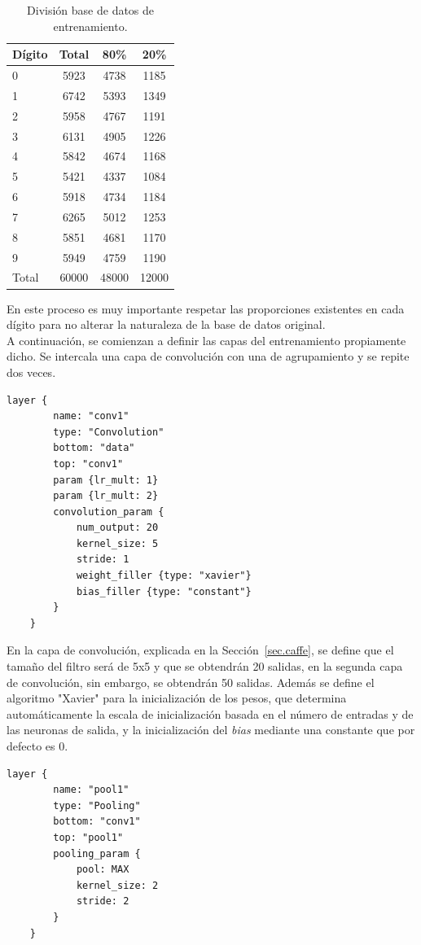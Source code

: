 	\begin{table}[H]
		\centering
		\begin{tabular}{|l|c|c|c|}
			\hline
			\textbf{Dígito} & \textbf{Total} & \textbf{80\%} & \textbf{20\%} \\
			\hline \hline
			0 & 5923 & 4738 & 1185\\ \hline
			1 & 6742 & 5393 & 1349\\ \hline
			2 & 5958 & 4767 & 1191\\ \hline
			3 & 6131 & 4905 & 1226\\ \hline
			4 & 5842 & 4674 & 1168\\ \hline
			5 & 5421 & 4337 & 1084\\ \hline
			6 & 5918 & 4734 & 1184\\ \hline
			7 & 6265 & 5012 & 1253\\ \hline
			8 & 5851 & 4681 & 1170\\ \hline
			9 & 5949 & 4759 & 1190\\ \hline
			Total & 60000 & 48000 & 12000\\ \hline
		\end{tabular}
		\caption{División base de datos de entrenamiento.}
		\label{tab.baseDatos}
	\end{table}
	\vspace{20pt}
	En este proceso es muy importante respetar las proporciones existentes en cada dígito para no alterar la naturaleza de la base de datos original.\\
	
	A continuación, se comienzan a definir las capas del entrenamiento propiamente dicho. Se intercala una capa de convolución con una de agrupamiento y se repite dos veces.
	\vspace{10pt}
	\begin{lstlisting}[frame=single]
	layer {
		name: "conv1"
		type: "Convolution"
		bottom: "data"
		top: "conv1"
		param {lr_mult: 1}
		param {lr_mult: 2}
		convolution_param {
			num_output: 20
			kernel_size: 5
			stride: 1
			weight_filler {type: "xavier"}
			bias_filler {type: "constant"}
		}
	}	
	\end{lstlisting}

	En la capa de convolución, explicada en la Sección~\ref{sec.caffe}, se define que el tamaño del filtro será de 5x5 y que se obtendrán 20 salidas, en la segunda capa de convolución, sin embargo, se obtendrán 50 salidas. Además se define el algoritmo "Xavier" para la inicialización de los pesos, que determina automáticamente la escala de inicialización basada en el número de entradas y de las neuronas de salida, y la inicialización del \textit{bias} mediante una constante que por defecto es 0.
	\vspace{10pt}
	\begin{lstlisting}[frame=single]
	layer {
		name: "pool1"
		type: "Pooling"
		bottom: "conv1"
		top: "pool1"
		pooling_param {
			pool: MAX
			kernel_size: 2
			stride: 2
		}
	}	
	\end{lstlisting}
	
